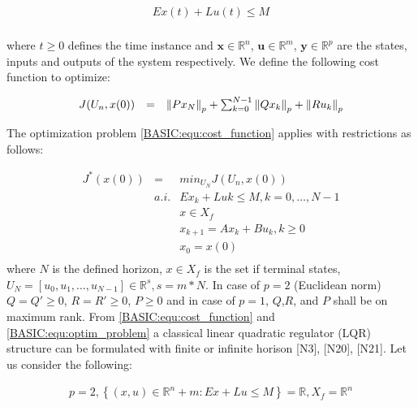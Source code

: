	\begin{equation}
        \begin{array}{rcl}
            Ex(t)+Lu(t)\leq M\\
        \end{array}
        \label{BASIC:equ:restrict_LTI}
    \end{equation}
		
		where $t\geq0$ defines the time instance and $\textbf{x}\in \mathbb{R}^n$, $\textbf{u}\in \mathbb{R}^m$, $\textbf{y}\in \mathbb{R}^p$ are the states, inputs and outputs of the system respectively. We define the following cost function to optimize:
		
		\begin{equation}
        \begin{array}{rcl}
         J(U_n,x(0))&=&\left\lVert{Px_N}\right\rVert_p+\sum^{N-1}_{k=0}\left\lVert Qx_k\right\rVert_p+\left\lVert Ru_k\right\rVert_p\\
        \end{array}
        \label{BASIC:equ:cost_function}
    \end{equation}
		
		The optimization problem \ref{BASIC:equ:cost_function} applies with restrictions as follows:
		
		\begin{equation}
        \begin{array}{rcl}
				J^*(x(0))&=&min_{U_N}J(U_n,x(0))\\
					&a.i.&Ex_k+Luk\leq M,k=0,\dots,N-1\\
					&&x\in X_f\\
					&&x_{k+1}=Ax_k+Bu_k,k\geq0\\
					&&x_0=x(0)\\
        \end{array}
        \label{BASIC:equ:optim_problem}
    \end{equation}
		where $N$ is the defined horizon, $x\in X_f$ is the set if terminal states, $U_N=[u_0,u_1,\dots,u_{N-1}]\in\mathbb{R}^s,s=m*N$. In case of $p=2$ (Euclidean norm) $Q=Q'\geq0$, $R=R'\geq0$, $P\geq0$ and in case of $p=1$, $Q$,$R$, and $P$ shall be on maximum rank.
		From \ref{BASIC:equ:cost_function} and \ref{BASIC:equ:optim_problem} a classical linear quadratic regulator (LQR) structure can be formulated with finite or infinite horison [N3], [N20], [N21].
		Let us consider the following:
		
		\begin{equation}
        \begin{array}{c}
         p=2, \left\{(x,u)\in\mathbb{R}^n+m:Ex+Lu\leq M\right\}=\mathbb{R},X_f=\mathbb{R}^n\\
        \end{array}
        \label{BASIC:equ:quadratic_case}
    \end{equation}
		
